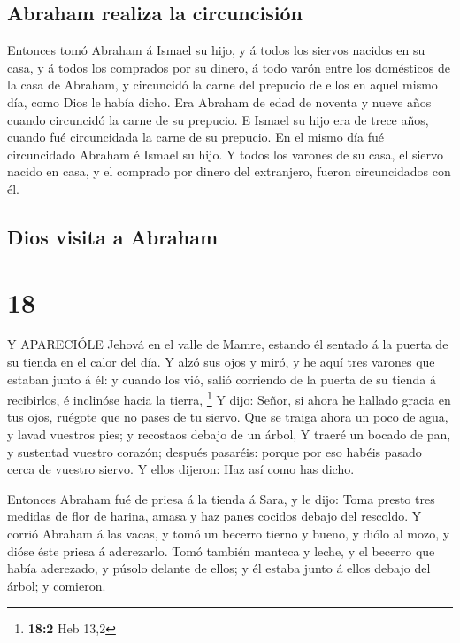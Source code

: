 \hypertarget{abraham-realiza-la-circuncisiuxf3n}{%
\subsection{Abraham realiza la
circuncisión}\label{abraham-realiza-la-circuncisiuxf3n}}

 Entonces tomó Abraham á Ismael su hijo, y á todos los
siervos nacidos en su casa, y á todos los comprados por su dinero, á
todo varón entre los domésticos de la casa de Abraham, y circuncidó la
carne del prepucio de ellos en aquel mismo día, como Dios le había
dicho.  Era Abraham de edad de noventa y nueve años cuando
circuncidó la carne de su prepucio.  E Ismael su hijo era
de trece años, cuando fué circuncidada la carne de su prepucio.
 En el mismo día fué circuncidado Abraham é Ismael su hijo.
 Y todos los varones de su casa, el siervo nacido en casa,
y el comprado por dinero del extranjero, fueron circuncidados con él.

\hypertarget{dios-visita-a-abraham}{%
\subsection{Dios visita a Abraham}\label{dios-visita-a-abraham}}

\hypertarget{section-17}{%
\section{18}\label{section-17}}

 Y APARECIÓLE Jehová en el valle de Mamre, estando él
sentado á la puerta de su tienda en el calor del día.  Y
alzó sus ojos y miró, y he aquí tres varones que estaban junto á él: y
cuando los vió, salió corriendo de la puerta de su tienda á recibirlos,
é inclinóse hacia la tierra, \footnote{\textbf{18:2} Heb 13,2}
 Y dijo: Señor, si ahora he hallado gracia en tus ojos,
ruégote que no pases de tu siervo.  Que se traiga ahora un
poco de agua, y lavad vuestros pies; y recostaos debajo de un árbol,
 Y traeré un bocado de pan, y sustentad vuestro corazón;
después pasaréis: porque por eso habéis pasado cerca de vuestro siervo.
Y ellos dijeron: Haz así como has dicho.

 Entonces Abraham fué de priesa á la tienda á Sara, y le
dijo: Toma presto tres medidas de flor de harina, amasa y haz panes
cocidos debajo del rescoldo.  Y corrió Abraham á las vacas,
y tomó un becerro tierno y bueno, y diólo al mozo, y dióse éste priesa á
aderezarlo.  Tomó también manteca y leche, y el becerro que
había aderezado, y púsolo delante de ellos; y él estaba junto á ellos
debajo del árbol; y comieron.

